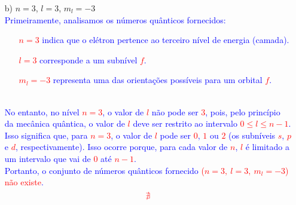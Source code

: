 \documentclass[a4paper, 12pt]{article}
\begin{document}
\begin{enumerate}
\begin{enumerate}
		            
		      \item[b)] \(n = 3\), \(l = 3\), \(m_l = -3\)
		            \\[10pt]
		            \textcolor{blue}{Primeiramente, analisamos os números quânticos fornecidos:}
		            \textcolor{blue}{
			            \begin{itemize}
				            \item[] \textcolor{red}{\(n = 3\)} indica que o elétron pertence ao terceiro nível de energia (camada).
				            \item[] \textcolor{red}{\(l = 3\)} corresponde a um subnível \textcolor{red}{\(f\)}.
				            \item[] \textcolor{red}{\(m_l = -3\)} representa uma das orientações possíveis para um orbital \textcolor{red}{\(f\)}.
			            \end{itemize}}
		            \textcolor{blue}{\\No entanto, no nível \textcolor{red}{\(n = 3\)}, o valor de \textcolor{red}{\(l\)} não pode ser \textcolor{red}{\(3\)}, pois, pelo princípio da mecânica quântica, o valor de \textcolor{red}{\(l\)} deve ser restrito ao intervalo \textcolor{red}{\(0 \leq l \leq n-1\)}. Isso significa que, para \textcolor{red}{\(n = 3\)}, o valor de \textcolor{red}{\(l\)} pode ser \textcolor{red}{\(0\)}, \textcolor{red}{\(1\)} ou \textcolor{red}{\(2\)} (os subníveis \textcolor{red}{\(s\)}, \textcolor{red}{\(p\)} e \textcolor{red}{\(d\)}, respectivamente). Isso ocorre porque, para cada valor de \textcolor{red}{\(n\)}, \textcolor{red}{\(l\)} é limitado a um intervalo que vai de \textcolor{red}{\(0\)} até \textcolor{red}{\(n-1\)}.}
		            \\[10pt]
		            \textcolor{blue}{Portanto, o conjunto de números quânticos fornecido \textcolor{red}{(\( n = 3, \ l = 3, \ m_l = -3\))} \textcolor{red}{não existe}.}
		            \[
			            \textcolor{red}{\nexists}
		            \]
		            
		            
		            
	      \end{enumerate}
	      

\end{enumerate}
\end{document}
